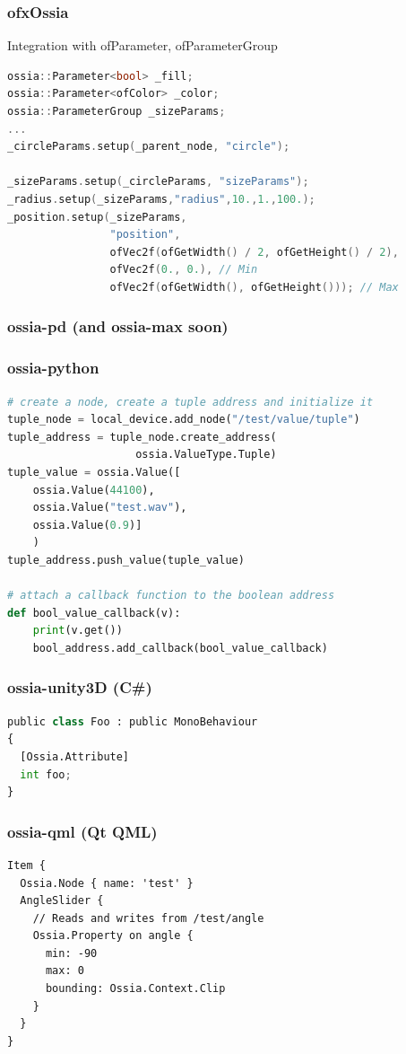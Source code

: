 \documentclass[handout]{beamer}
\begin{document}
\begin{frame}[fragile]
\frametitle{ofxOssia}
\Large Integration with ofParameter, ofParameterGroup
~\\
\footnotesize
\begin{lstlisting}[language=C++]
ossia::Parameter<bool> _fill;
ossia::Parameter<ofColor> _color;
ossia::ParameterGroup _sizeParams;
...
_circleParams.setup(_parent_node, "circle");

_sizeParams.setup(_circleParams, "sizeParams");
_radius.setup(_sizeParams,"radius",10.,1.,100.);
_position.setup(_sizeParams,
                "position",
                ofVec2f(ofGetWidth() / 2, ofGetHeight() / 2),
                ofVec2f(0., 0.), // Min
                ofVec2f(ofGetWidth(), ofGetHeight())); // Max
\end{lstlisting}
\end{frame}

\begin{frame}
\frametitle{ossia-pd (and ossia-max soon)}
\Large
\end{frame}

\begin{frame}[fragile]
\frametitle{ossia-python}
\footnotesize
\begin{lstlisting}[language=python]
# create a node, create a tuple address and initialize it
tuple_node = local_device.add_node("/test/value/tuple")
tuple_address = tuple_node.create_address(
                    ossia.ValueType.Tuple)
tuple_value = ossia.Value([
    ossia.Value(44100), 
    ossia.Value("test.wav"), 
    ossia.Value(0.9)]
    )
tuple_address.push_value(tuple_value)

# attach a callback function to the boolean address
def bool_value_callback(v):
    print(v.get())
    bool_address.add_callback(bool_value_callback)
\end{lstlisting}
\end{frame}

\begin{frame}[fragile]
\frametitle{ossia-unity3D (C\#)}
\Large
\footnotesize
\begin{lstlisting}[language=python]
public class Foo : public MonoBehaviour 
{
  [Ossia.Attribute]
  int foo;
}
\end{lstlisting}
\end{frame}

\begin{frame}[fragile]
\frametitle{ossia-qml (Qt QML)}
\small
\begin{lstlisting}
Item { 
  Ossia.Node { name: 'test' }
  AngleSlider {
    // Reads and writes from /test/angle
    Ossia.Property on angle {
      min: -90
      max: 0
      bounding: Ossia.Context.Clip
    }
  }
}
\end{lstlisting}
\end{frame}
\end{document}
